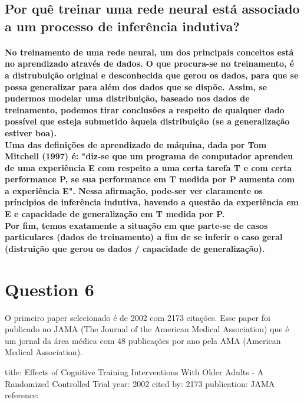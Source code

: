 \documentclass[a4paper]{article}    %
\begin{document}
\subsection*{Por quê treinar uma rede neural está associado a um processo de inferência indutiva?}

\paragraph{No treinamento de uma rede neural, um dos principais conceitos está no aprendizado através de dados. O que procura-se no treinamento, é a distrubuição original e desconhecida que gerou os dados, para que se possa generalizar para além dos dados que se dispõe. Assim, se pudermos modelar uma distribuição, baseado nos dados de treinamento, podemos tirar conclusões a respeito de qualquer dado possível que esteja submetido àquela distribuição (se a generalização estiver boa).\\
Uma das definições de aprendizado de máquina, dada por Tom Mitchell (1997) é: "diz-se que um programa de computador aprendeu de uma experiência E com respeito a uma certa tarefa T e com certa performance P, se sua performance em T medida por P aumenta com a experiência E". Nessa afirmação, pode-ser ver claramente os príncipios de inferência indutiva, havendo a questão da experiência em E e capacidade de generalização em T medida por P.\\
Por fim, temos exatamente a situação em que parte-se de casos particulares (dados de treinamento) a fim de se inferir o caso geral (distruição que gerou os dados / capacidade de generalização).}

\newpage

\section*{Question 6}

O primeiro paper selecionado é de 2002 com 2173 citações. Esse paper foi publicado no JAMA (The Journal of the American Medical Association) que é um jornal da área médica com 48 publicações por ano pela AMA (American Medical Association).

title: Effects of Cognitive Training Interventions With Older Adults - A Randomized Controlled Trial
year: 2002
cited by: 2173
publication: JAMA
reference:
\end{document}

